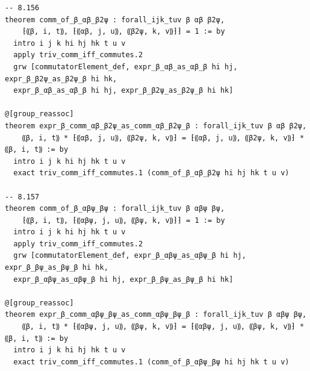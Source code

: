 \begin{Verbatim}
-- 8.156
theorem comm_of_β_αβ_β2ψ : forall_ijk_tuv β αβ β2ψ,
    ⁅⸨β, i, t⸩, ⁅⸨αβ, j, u⸩, ⸨β2ψ, k, v⸩⁆⁆ = 1 := by
  intro i j k hi hj hk t u v
  apply triv_comm_iff_commutes.2
  grw [commutatorElement_def, expr_β_αβ_as_αβ_β hi hj, expr_β_β2ψ_as_β2ψ_β hi hk,
  expr_β_αβ_as_αβ_β hi hj, expr_β_β2ψ_as_β2ψ_β hi hk]

@[group_reassoc]
theorem expr_β_comm_αβ_β2ψ_as_comm_αβ_β2ψ_β : forall_ijk_tuv β αβ β2ψ,
    ⸨β, i, t⸩ * ⁅⸨αβ, j, u⸩, ⸨β2ψ, k, v⸩⁆ = ⁅⸨αβ, j, u⸩, ⸨β2ψ, k, v⸩⁆ * ⸨β, i, t⸩ := by
  intro i j k hi hj hk t u v
  exact triv_comm_iff_commutes.1 (comm_of_β_αβ_β2ψ hi hj hk t u v)

-- 8.157
theorem comm_of_β_αβψ_βψ : forall_ijk_tuv β αβψ βψ,
    ⁅⸨β, i, t⸩, ⁅⸨αβψ, j, u⸩, ⸨βψ, k, v⸩⁆⁆ = 1 := by
  intro i j k hi hj hk t u v
  apply triv_comm_iff_commutes.2
  grw [commutatorElement_def, expr_β_αβψ_as_αβψ_β hi hj, expr_β_βψ_as_βψ_β hi hk,
  expr_β_αβψ_as_αβψ_β hi hj, expr_β_βψ_as_βψ_β hi hk]

@[group_reassoc]
theorem expr_β_comm_αβψ_βψ_as_comm_αβψ_βψ_β : forall_ijk_tuv β αβψ βψ,
    ⸨β, i, t⸩ * ⁅⸨αβψ, j, u⸩, ⸨βψ, k, v⸩⁆ = ⁅⸨αβψ, j, u⸩, ⸨βψ, k, v⸩⁆ * ⸨β, i, t⸩ := by
  intro i j k hi hj hk t u v
  exact triv_comm_iff_commutes.1 (comm_of_β_αβψ_βψ hi hj hk t u v)


\end{Verbatim}
